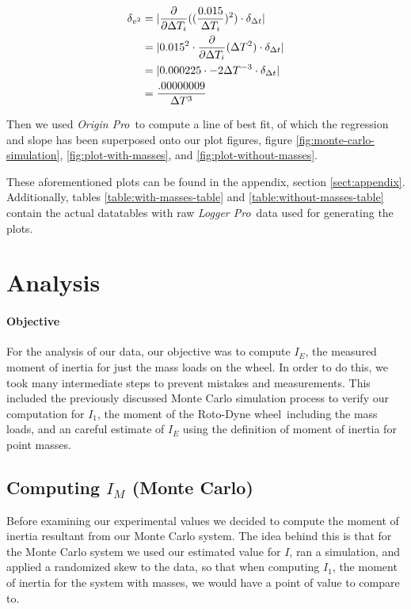 \documentclass[coverpage]{article}
\newcommand{\softwareText}[1]{\textit{#1}\texttrademark}
\newcommand{\loggerpro}{\softwareText{Logger Pro}}
\newcommand{\origin}{\softwareText{Origin Pro}}
\newcommand{\rwheel}{Roto-Dyne wheel}
\begin{document}
	\begin{align}
		\delta_{v^2}&=|\frac{\partial}{\partial \Delta{T_i}} ((\frac{0.015}{\Delta{T}_i})^2) \cdot \delta_{\Delta{t}}| \notag \\
		&=|0.015^2 \cdot \frac{\partial}{\partial \Delta{T_i}} (\Delta{T}^2) \cdot \delta_{\Delta{t}}| \notag \\
		&=|0.000225 \cdot -2 \Delta{T}^{-3} \cdot \delta_{\Delta{t}}| \notag \\
		&=\frac{.00000009}{\Delta{T}^3}
		\label{eq:vsqr-uncert}
	\end{align}
	
	Then we used \origin~to compute a line of best fit, of which the regression and slope has been superposed onto our plot figures, figure \ref{fig:monte-carlo-simulation}, \ref{fig:plot-with-masses}, and \ref{fig:plot-without-masses}.
	
	These aforementioned plots can be found in the appendix, section \ref{sect:appendix}. Additionally, tables \ref{table:with-masses-table} and \ref{table:without-masses-table} contain the actual datatables with raw \loggerpro~data used for generating the plots.
	
	\section{Analysis}
	
	\paragraph{Objective}
	
	For the analysis of our data, our objective was to compute $I_E$, the measured moment of inertia for just the mass loads on the wheel. In order to do this, we took many intermediate steps to prevent mistakes and measurements. This included the previously discussed Monte Carlo simulation process to verify our computation for $I_1$, the moment of the \rwheel~including the mass loads, and an careful estimate of $I_E$ using the definition of moment of inertia for point masses.
	
	\subsection{Computing $I_M$ (Monte Carlo)}
	
	Before examining our experimental values we decided to compute the moment of inertia resultant from our Monte Carlo system. The idea behind this is that for the Monte Carlo system we used our estimated value for $I$, ran a simulation, and applied a randomized skew to the data, so that when computing $I_1$, the moment of inertia for the system with masses, we would have a point of value to compare to.
\end{document}
